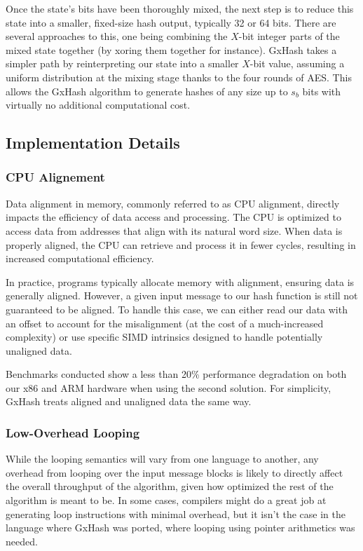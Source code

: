 \documentclass[10pt]{article}
\begin{document}
Once the state's bits have been thoroughly mixed, the next step is to reduce this state into a smaller, fixed-size hash output, typically 32 or 64 bits. There are several approaches to this, one being combining the \( X \)-bit integer parts of the mixed state together (by xoring them together for instance). GxHash takes a simpler path by reinterpreting our state into a smaller \( X \)-bit value, assuming a uniform distribution at the mixing stage thanks to the four rounds of AES. This allows the GxHash algorithm to generate hashes of any size up to \( s_b \) bits with virtually no additional computational cost.

\subsection{Implementation Details}

\subsubsection{CPU Alignement}

Data alignment in memory, commonly referred to as CPU alignment, directly impacts the efficiency of data access and processing. The CPU is optimized to access data from addresses that align with its natural word size. When data is properly aligned, the CPU can retrieve and process it in fewer cycles, resulting in increased computational efficiency.

In practice, programs typically allocate memory with alignment, ensuring data is generally aligned. However, a given input message to our hash function is still not guaranteed to be aligned. To handle this case, we can either read our data with an offset to account for the misalignment (at the cost of a much-increased complexity) or use specific SIMD intrinsics designed to handle potentially unaligned data. 

Benchmarks conducted show a less than 20\% performance degradation on both our x86 and ARM hardware when using the second solution. For simplicity, GxHash treats aligned and unaligned data the same way.

\subsubsection{Low-Overhead Looping}

While the looping semantics will vary from one language to another, any overhead from looping over the input message blocks is likely to directly affect the overall throughput of the algorithm, given how optimized the rest of the algorithm is meant to be. In some cases, compilers might do a great job at generating loop instructions with minimal overhead, but it isn't the case in the language where GxHash was ported, where looping using pointer arithmetics was needed.
\end{document}
